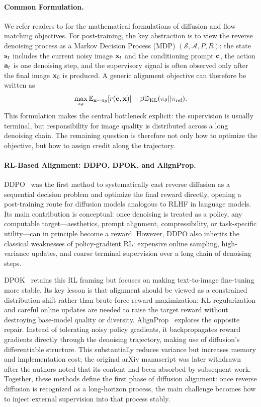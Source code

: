 \paragraph{Common Formulation.}
We refer readers to  for the mathematical formulations of diffusion and flow matching objectives. For post-training, the key abstraction is to view the reverse denoising process as a Markov Decision Process (MDP) $(\mathcal{S}, \mathcal{A}, P, R)$: the state $\mathbf{s}_t$ includes the current noisy image $\mathbf{x}_t$ and the conditioning prompt $\mathbf{c}$, the action $\mathbf{a}_t$ is one denoising step, and the supervisory signal is often observed only after the final image $\mathbf{x}_0$ is produced. A generic alignment objective can therefore be written as
\begin{equation}
    \max_{\pi_\theta} \mathbb{E}_{\mathbf{x} \sim \pi_\theta} [r(\mathbf{c}, \mathbf{x})] - \beta \mathbb{D}_{\text{KL}}(\pi_\theta || \pi_{\text{ref}}).
\end{equation}
This formulation makes the central bottleneck explicit: the supervision is usually terminal, but responsibility for image quality is distributed across a long denoising chain. The remaining question is therefore not only how to optimize the objective, but how to assign credit along the trajectory.

\paragraph{RL-Based Alignment: DDPO, DPOK, and AlignProp.}
DDPO~\citep{black2023training} was the first method to systematically cast reverse diffusion as a sequential decision problem and optimize the final reward directly, opening a post-training route for diffusion models analogous to RLHF in language models. Its main contribution is conceptual: once denoising is treated as a policy, any computable target---aesthetics, prompt alignment, compressibility, or task-specific utility---can in principle become a reward. However, DDPO also inherits the classical weaknesses of policy-gradient RL: expensive online sampling, high-variance updates, and coarse terminal supervision over a long chain of denoising steps.

DPOK~\citep{fan2023dpok} retains this RL framing but focuses on making text-to-image fine-tuning more stable. Its key lesson is that alignment should be viewed as a constrained distribution shift rather than brute-force reward maximization: KL regularization and careful online updates are needed to raise the target reward without destroying base-model quality or diversity. AlignProp~\citep{prabhudesai2023alignprop} explores the opposite repair. Instead of tolerating noisy policy gradients, it backpropagates reward gradients directly through the denoising trajectory, making use of diffusion's differentiable structure. This substantially reduces variance but increases memory and implementation cost; the original arXiv manuscript was later withdrawn after the authors noted that its content had been absorbed by subsequent work. Together, these methods define the first phase of diffusion alignment: once reverse diffusion is recognized as a long-horizon process, the main challenge becomes how to inject external supervision into that process stably.

